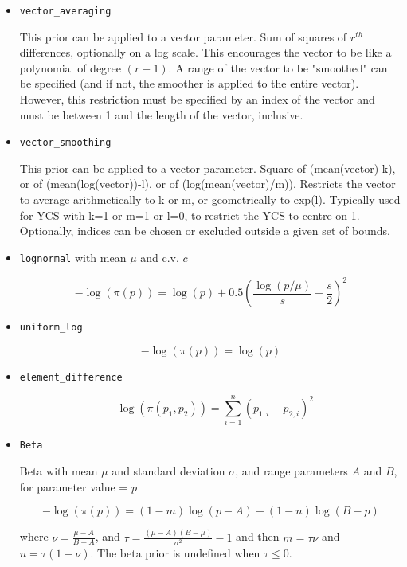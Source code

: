 \begin{itemize}
	\item \texttt{vector\_averaging}
	
	This prior can be applied to a vector parameter. Sum of squares of $r^{th}$ differences, optionally on a log scale. This encourages the vector to be like a polynomial of degree $(r-1)$. A range of the vector to be "smoothed" can be specified (and if not, the smoother is applied to the entire vector). However, this restriction must be specified by an index of the vector and must be between 1 and the length of the vector, inclusive.
	
	\item \texttt{vector\_smoothing}
	
	This prior can be applied to a vector parameter. Square of (mean(vector)-k), or of (mean(log(vector))-l), or of (log(mean(vector)/m)). Restricts the vector to average arithmetically to k or m, or geometrically to exp(l). Typically used for YCS with k=1 or m=1 or l=0, to restrict the YCS to centre on 1. Optionally, indices can be chosen or excluded outside a given set of bounds.
	
	\item\texttt{lognormal} with mean $\mu$ and c.v. $c$
	
	\begin{equation}
	- \log \left(\pi \left(p \right) \right) = \log \left( p \right) + 0.5 \left( \frac{\log \left( p / \mu \right)}{s} + \frac{s}{2} \right)^2
	\end{equation}

	\item\texttt{uniform\_log}

	\begin{equation}
	- \log \left(\pi \left(p \right) \right) = \log \left( p \right)
	\end{equation}
	
	\item\texttt{element\_difference}

	\begin{equation}
	- \log \left(\pi \left(p_1,p_2 \right) \right) = \sum_{i = 1}^n \left( p_{1,i} - p_{2,i} \right)^2
	\end{equation}

	\item\texttt{Beta}
	
	{Beta with mean $\mu$ and standard deviation $\sigma$, and range parameters $A$ and $B$, for parameter value = $p$}

	\begin{equation}
	- \log \left(\pi \left( p \right) \right) = \left( 1 - m \right) \log \left( p - A \right) + \left( 1 - n \right)\log \left( B - p \right)
	\end{equation}
	
	where $\nu  = \frac{\mu  - A}{B - A}$, and $\tau = \frac{\left(\mu -A \right)\left(B - \mu \right)}{\sigma ^2} - 1$ and then $m=\tau \nu$ and $n=\tau(1-\nu)$. The beta prior is undefined when $\tau \leq 0$.
\end{itemize}

